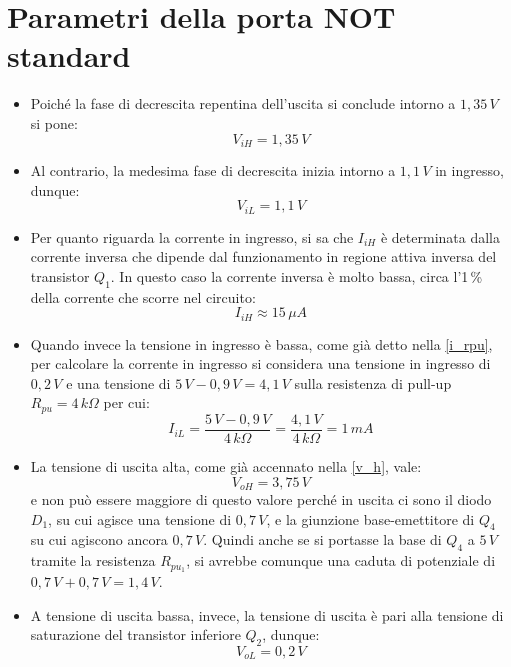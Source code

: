 \documentclass[12pt, a4paper]{report}
\begin{document}
\section{Parametri della porta NOT standard}
\begin{itemize}
    \item Poiché la fase di decrescita repentina dell'uscita si conclude intorno a $1,35\,V$ si pone:
    \begin{equation}
        V_{iH} = 1,35\,V
    \end{equation}
    \item Al contrario, la medesima fase di decrescita inizia intorno a $1,1\,V$ in ingresso, dunque:
    \begin{equation}
        V_{iL} = 1,1\,V
    \end{equation}
    \item Per quanto riguarda la corrente in ingresso, si sa che $I_{iH}$ è determinata dalla corrente inversa che dipende dal funzionamento in regione attiva inversa del transistor $Q_1$. In questo caso la corrente inversa è molto bassa, circa l'1\,\% della corrente che scorre nel circuito:
    \begin{equation}
        I_{iH} \approx 15\,\mu A
    \end{equation}
    \item Quando invece la tensione in ingresso è bassa, come già detto nella \eqref{i_rpu}, per calcolare la corrente in ingresso si considera una tensione in ingresso di $0,2\,V$ e una tensione di $5\,V - 0,9\,V = 4,1\,V$ sulla resistenza di pull-up $R_{pu} = 4\,k\Omega$ per cui:
    \begin{equation}
        I_{iL} = \frac{5\,V - 0,9\,V}{4\,k\Omega} = \frac{4,1\,V}{4\,k\Omega} = 1\,mA
    \end{equation}
    \item La tensione di uscita alta, come già accennato nella \eqref{v_h}, vale:
    \begin{equation}
        V_{oH} = 3,75\,V
    \end{equation}
    e non può essere maggiore di questo valore perché in uscita ci sono il diodo $D_1$, su cui agisce una tensione di $0,7\,V$, e la giunzione base-emettitore di $Q_4$ su cui agiscono ancora $0,7\,V$. Quindi anche se si portasse la base di $Q_4$ a $5\,V$ tramite la resistenza $R_{pu_{1}}$, si avrebbe comunque una caduta di potenziale di $0,7\,V + 0,7\,V = 1,4\,V$.
    \item A tensione di uscita bassa, invece, la tensione di uscita è pari alla tensione di saturazione del transistor inferiore $Q_2$, dunque:
    \begin{equation}
        V_{oL} = 0,2\,V
    \end{equation}
\end{itemize}
\end{document}
